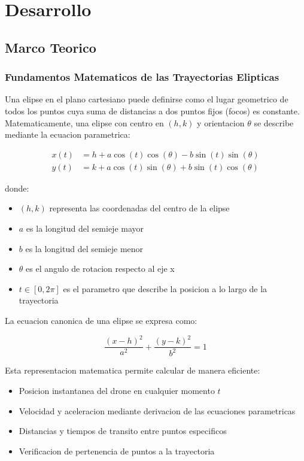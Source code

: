 \documentclass[12pt,a4paper]{article}
\begin{document}
\section{Desarrollo}

\subsection{Marco Teorico}

\subsubsection{Fundamentos Matematicos de las Trayectorias Elipticas}

Una elipse en el plano cartesiano puede definirse como el lugar geometrico de todos los puntos cuya suma de distancias a dos puntos fijos (focos) es constante. Matematicamente, una elipse con centro en $(h,k)$ y orientacion $\theta$ se describe mediante la ecuacion parametrica:

\begin{align}
x(t) &= h + a\cos(t)\cos(\theta) - b\sin(t)\sin(\theta) \\
y(t) &= k + a\cos(t)\sin(\theta) + b\sin(t)\cos(\theta)
\end{align}

donde:
\begin{itemize}
    \item $(h,k)$ representa las coordenadas del centro de la elipse
    \item $a$ es la longitud del semieje mayor
    \item $b$ es la longitud del semieje menor
    \item $\theta$ es el angulo de rotacion respecto al eje x
    \item $t \in [0, 2\pi]$ es el parametro que describe la posicion a lo largo de la trayectoria
\end{itemize}

La ecuacion canonica de una elipse se expresa como:

\[\frac{(x-h)^2}{a^2} + \frac{(y-k)^2}{b^2} = 1\]

Esta representacion matematica permite calcular de manera eficiente:
\begin{itemize}
    \item Posicion instantanea del drone en cualquier momento $t$
    \item Velocidad y aceleracion mediante derivacion de las ecuaciones parametricas
    \item Distancias y tiempos de transito entre puntos especificos
    \item Verificacion de pertenencia de puntos a la trayectoria
\end{itemize}
\end{document}
